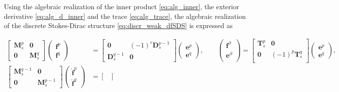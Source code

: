 \documentclass{elsarticle}
\newcommand*{\dual}[1]{\ensuremath{\widehat{#1}}}
\begin{document}
 
Using the algebraic realization  of the inner product \eqref{eq:alg_inner}, the exterior derivative \eqref{eq:alg_d_inner} and the trace \eqref{eq:alg_trace}, the algebraic realization of the discrete Stokes-Dirac structure \eqref{eq:discr_weak_dfSDS} is expressed as

\begin{equation}\label{eq:discr_dfSDS}
\begin{aligned}
    \begin{bmatrix}
        \mathbf{M}^p_s & \mathbf{0} \\
        \mathbf{0} & \mathbf{M}^q_s
    \end{bmatrix}
    \begin{pmatrix}
    \mathbf{f}^p \\
    \mathbf{f}^q
    \end{pmatrix} &=
    \begin{bmatrix}
        \mathbf{0} & (-1)^r\mathbf{D}^{p-1}_s \\
        \mathbf{D}^{q-1}_s & \mathbf{0}
    \end{bmatrix}
    \begin{pmatrix}
    \mathbf{e}^p \\
    \mathbf{e}^q
    \end{pmatrix}, \qquad
    \begin{pmatrix}
    \mathbf{f}^\partial \\
    \mathbf{e}^\partial \\
    \end{pmatrix} = 
    \begin{bmatrix}
    \mathbf{T}^p_s & \mathbf{0} \\
    \mathbf{0} & (-1)^p\mathbf{T}^q_s \\
    \end{bmatrix}
    \begin{pmatrix}
    \mathbf{e}^p \\
    \mathbf{e}^q
    \end{pmatrix}, \\
    \begin{bmatrix}
        \mathbf{M}^{q-1}_s & \mathbf{0} \\
        \mathbf{0} & \mathbf{M}^{p-1}_s
    \end{bmatrix}
    \begin{pmatrix}
    \dual{\mathbf{f}}^p \\
    \dual{\mathbf{f}}^q
    \end{pmatrix} &=
    \begin{bmatrix}

\end{bmatrix}
\end{aligned}
\end{equation}
\end{document}
